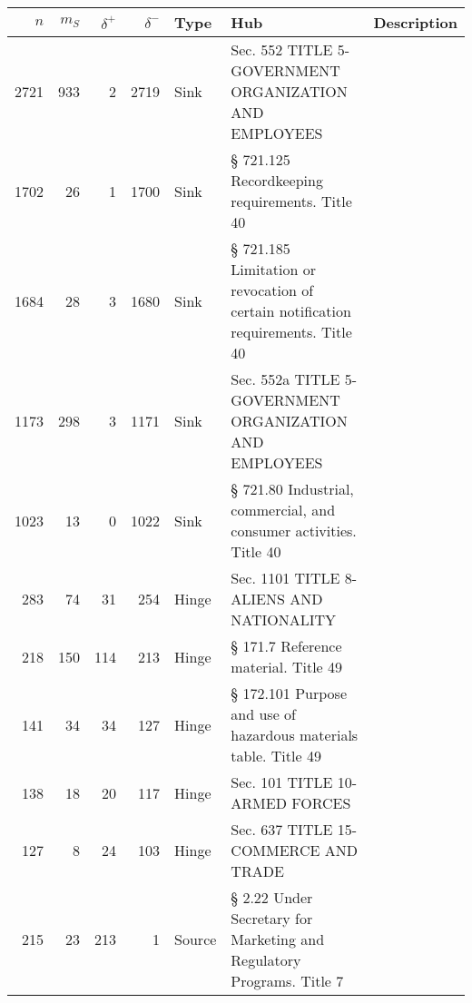 \begin{tabular}{rrrrlp{}p{}}
\hline
   $n$ &   $m_S$ &   $\delta^+$ &   $\delta^-$ & \textbf{Type}   & \textbf{Hub}                                                                      & \textbf{Description}   \\
\hline
  2721 &     933 &            2 &         2719 & Sink            & Sec. 552 TITLE 5-GOVERNMENT ORGANIZATION AND EMPLOYEES                            &                        \\
  1702 &      26 &            1 &         1700 & Sink            & § 721.125 Recordkeeping requirements. Title 40                                    &                        \\
  1684 &      28 &            3 &         1680 & Sink            & § 721.185 Limitation or revocation of certain notification requirements. Title 40 &                        \\
  1173 &     298 &            3 &         1171 & Sink            & Sec. 552a TITLE 5-GOVERNMENT ORGANIZATION AND EMPLOYEES                           &                        \\
  1023 &      13 &            0 &         1022 & Sink            & § 721.80 Industrial, commercial, and consumer activities. Title 40                &                        \\
   283 &      74 &           31 &          254 & Hinge           & Sec. 1101 TITLE 8-ALIENS AND NATIONALITY                                          &                        \\
   218 &     150 &          114 &          213 & Hinge           & § 171.7 Reference material. Title 49                                              &                        \\
   141 &      34 &           34 &          127 & Hinge           & § 172.101 Purpose and use of hazardous materials table. Title 49                  &                        \\
   138 &      18 &           20 &          117 & Hinge           & Sec. 101 TITLE 10-ARMED FORCES                                                    &                        \\
   127 &       8 &           24 &          103 & Hinge           & Sec. 637 TITLE 15-COMMERCE AND TRADE                                              &                        \\
   215 &      23 &          213 &            1 & Source          & § 2.22 Under Secretary for Marketing and Regulatory Programs. Title 7             &                        \\

\end{tabular}
